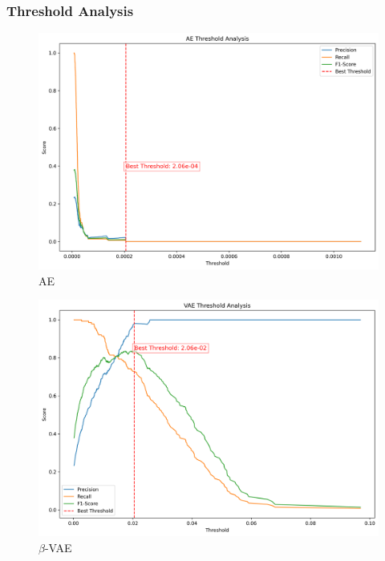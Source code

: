 \subsubsection{Threshold Analysis}

\begin{figure}[!h]
  \centering
  \includegraphics[scale=0.5]{figures/anomalies/ae/threshold.png}
  \caption{AE}
  \label{fig:threshold_ae}
\end{figure}

\begin{figure}[!h]
  \centering
  \includegraphics[scale=0.5]{figures/anomalies/vae/threshold.png}
  \caption{$\beta$-VAE}
  \label{fig:threshold_vae}
\end{figure}


